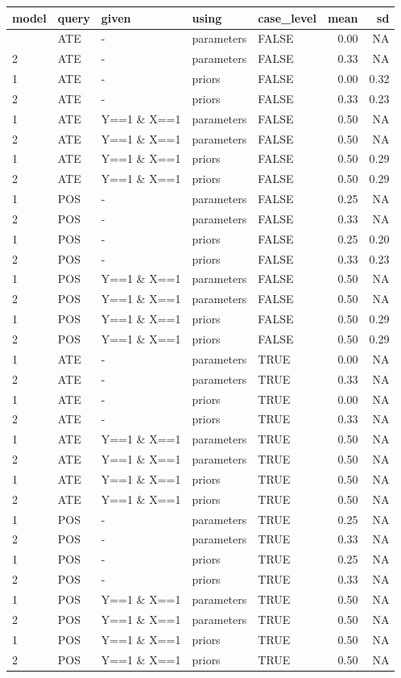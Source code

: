 \documentclass[
  article]{jss}
\begin{document}
\begin{longtable}[]{@{}lllllrr@{}}
\toprule\noalign{}
model & query & given & using & case\_level & mean & sd \\
\midrule\noalign{}
\endhead
\bottomrule\noalign{}
\endlastfoot
1 & ATE & - & parameters & FALSE & 0.00 & NA \\
2 & ATE & - & parameters & FALSE & 0.33 & NA \\
1 & ATE & - & priors & FALSE & 0.00 & 0.32 \\
2 & ATE & - & priors & FALSE & 0.33 & 0.23 \\
1 & ATE & Y==1 \& X==1 & parameters & FALSE & 0.50 & NA \\
2 & ATE & Y==1 \& X==1 & parameters & FALSE & 0.50 & NA \\
1 & ATE & Y==1 \& X==1 & priors & FALSE & 0.50 & 0.29 \\
2 & ATE & Y==1 \& X==1 & priors & FALSE & 0.50 & 0.29 \\
1 & POS & - & parameters & FALSE & 0.25 & NA \\
2 & POS & - & parameters & FALSE & 0.33 & NA \\
1 & POS & - & priors & FALSE & 0.25 & 0.20 \\
2 & POS & - & priors & FALSE & 0.33 & 0.23 \\
1 & POS & Y==1 \& X==1 & parameters & FALSE & 0.50 & NA \\
2 & POS & Y==1 \& X==1 & parameters & FALSE & 0.50 & NA \\
1 & POS & Y==1 \& X==1 & priors & FALSE & 0.50 & 0.29 \\
2 & POS & Y==1 \& X==1 & priors & FALSE & 0.50 & 0.29 \\
1 & ATE & - & parameters & TRUE & 0.00 & NA \\
2 & ATE & - & parameters & TRUE & 0.33 & NA \\
1 & ATE & - & priors & TRUE & 0.00 & NA \\
2 & ATE & - & priors & TRUE & 0.33 & NA \\
1 & ATE & Y==1 \& X==1 & parameters & TRUE & 0.50 & NA \\
2 & ATE & Y==1 \& X==1 & parameters & TRUE & 0.50 & NA \\
1 & ATE & Y==1 \& X==1 & priors & TRUE & 0.50 & NA \\
2 & ATE & Y==1 \& X==1 & priors & TRUE & 0.50 & NA \\
1 & POS & - & parameters & TRUE & 0.25 & NA \\
2 & POS & - & parameters & TRUE & 0.33 & NA \\
1 & POS & - & priors & TRUE & 0.25 & NA \\
2 & POS & - & priors & TRUE & 0.33 & NA \\
1 & POS & Y==1 \& X==1 & parameters & TRUE & 0.50 & NA \\
2 & POS & Y==1 \& X==1 & parameters & TRUE & 0.50 & NA \\
1 & POS & Y==1 \& X==1 & priors & TRUE & 0.50 & NA \\
2 & POS & Y==1 \& X==1 & priors & TRUE & 0.50 & NA \\
\end{longtable}
\end{document}
